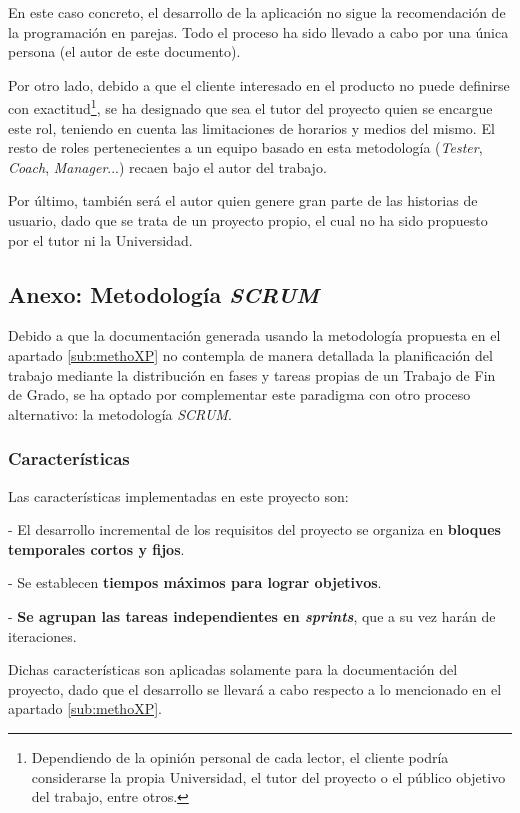En este caso concreto, el desarrollo de la aplicación no sigue la recomendación de la programación en parejas. Todo el proceso ha sido llevado a cabo por una única persona (el autor de este documento).\sn

Por otro lado, debido a que el cliente interesado en el producto no puede definirse con exactitud\footnote{Dependiendo de la opinión personal de cada lector, el cliente podría considerarse la propia Universidad, el tutor del proyecto o el público objetivo del trabajo, entre otros.}, se ha designado que sea el tutor del proyecto quien se encargue este rol, teniendo en cuenta las limitaciones de horarios y medios del mismo. El resto de roles pertenecientes a un equipo basado en esta metodología (\textit{Tester}, \textit{Coach}, \textit{Manager}...) recaen bajo el autor del trabajo.\sn

Por último, también será el autor quien genere gran parte de las historias de usuario, dado que se trata de un proyecto propio, el cual no ha sido propuesto por el tutor ni la Universidad.

\subsection{Anexo: Metodología \textit{SCRUM}} \label{sub:methoSCRUM}

Debido a que la documentación generada usando la metodología propuesta en el apartado \ref{sub:methoXP} no contempla de manera detallada la planificación del trabajo mediante la distribución en fases y tareas propias de un Trabajo de Fin de Grado, se ha optado por complementar este paradigma con otro proceso alternativo: la metodología \textit{SCRUM}.\sn

\subsubsection{Características} \label{subsub:methoSCRUMcaract}

Las características implementadas en este proyecto son:\sn

- El desarrollo incremental de los requisitos del proyecto se organiza en \textbf{bloques temporales cortos y fijos}.\sn

- Se establecen \textbf{tiempos máximos para lograr objetivos}.\sn

- \textbf{Se agrupan las tareas independientes en \textit{sprints}}, que a su vez harán de iteraciones.\sn

Dichas características son aplicadas solamente para la documentación del proyecto, dado que el desarrollo se llevará a cabo respecto a lo mencionado en el apartado \ref{sub:methoXP}.\n

